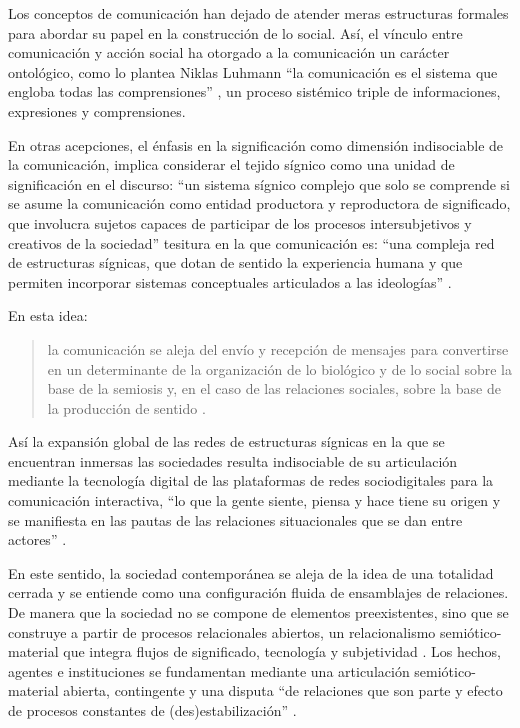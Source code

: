 \documentclass[
  spanish,
  11pt,
  a4paper,
]{scrbook}
\begin{document}
Los conceptos de comunicación han dejado de atender meras estructuras
formales para abordar su papel en la construcción de lo social. Así, el
vínculo entre comunicación y acción social ha otorgado a la comunicación
un carácter ontológico, como lo plantea Niklas Luhmann ``la comunicación
es el sistema que engloba todas las comprensiones''
\autocite[59]{Luhmann1998}, un proceso sistémico triple de
informaciones, expresiones y comprensiones.

En otras acepciones, el énfasis en la significación como dimensión
indisociable de la comunicación, implica considerar el tejido sígnico
como una unidad de significación en el discurso: ``un sistema sígnico
complejo que solo se comprende si se asume la comunicación como entidad
productora y reproductora de significado, que involucra sujetos capaces
de participar de los procesos intersubjetivos y creativos de la
sociedad'' \autocite[19]{Pardo2012} tesitura en la que comunicación es:
``una compleja red de estructuras sígnicas, que dotan de sentido la
experiencia humana y que permiten incorporar sistemas conceptuales
articulados a las ideologías'' \autocite[22]{Pardo2012}.

En esta idea:

\begin{quote}
la comunicación se aleja del envío y recepción de mensajes para
convertirse en un determinante de la organización de lo biológico y de
lo social sobre la base de la semiosis y, en el caso de las relaciones
sociales, sobre la base de la producción de sentido
\autocite[30]{Vidales2010}.
\end{quote}

Así la expansión global de las redes de estructuras sígnicas en la que
se encuentran inmersas las sociedades resulta indisociable de su
articulación mediante la tecnología digital de las plataformas de redes
sociodigitales para la comunicación interactiva, ``lo que la gente
siente, piensa y hace tiene su origen y se manifiesta en las pautas de
las relaciones situacionales que se dan entre actores''
\autocite[110]{Lozares1996}.

En este sentido, la sociedad contemporánea se aleja de la idea de una
totalidad cerrada y se entiende como una configuración fluida de
ensamblajes de relaciones. De manera que la sociedad no se compone de
elementos preexistentes, sino que se construye a partir de procesos
relacionales abiertos, un relacionalismo semiótico-material que integra
flujos de significado, tecnología y subjetividad
\autocite[69]{GarciaSelgas2015}. Los hechos, agentes e instituciones se
fundamentan mediante una articulación semiótico-material abierta,
contingente y una disputa ``de relaciones que son parte y efecto de
procesos constantes de (des)estabilización''
\autocite[76]{GarciaSelgas2015}.
\end{document}
